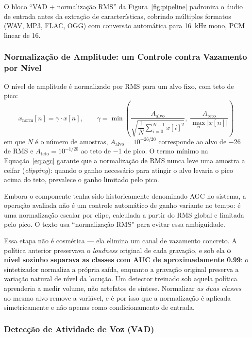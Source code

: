 \documentclass[12pt,a4paper]{article}
\begin{document}
O bloco ``VAD + normalização RMS'' da Figura~\ref{fig:pipeline} padroniza o áudio de
entrada antes da extração de características, cobrindo múltiplos formatos
(WAV, MP3, FLAC, OGG) com conversão automática para \SI{16}{\kilo\hertz}
mono, PCM linear de \SI{16}{\bit}.

\subsubsection*{Normalização de Amplitude: um Controle contra Vazamento por Nível}
\label{sec:agc}

O nível de amplitude é normalizado por RMS para um alvo fixo, com teto de pico:
\begin{equation}
	\label{eq:agc}
	x_{\mathrm{norm}}[n] = \gamma \cdot x[n], \qquad
	\gamma = \min\!\left(
	\frac{A_{\mathrm{alvo}}}{\sqrt{\dfrac{1}{N}\displaystyle\sum_{i=0}^{N-1}x[i]^2}},
	\;\frac{A_{\mathrm{teto}}}{\max_n |x[n]|}
	\right)
\end{equation}
\noindent
em que $N$ é o número de amostras, $A_{\mathrm{alvo}} = 10^{-26/20}$
corresponde ao alvo de \SI{-26}{\dBFS} de RMS e
$A_{\mathrm{teto}} = 10^{-1/20}$ ao teto de \SI{-1}{\dBFS} de pico. O termo
mínimo na Equação~\ref{eq:agc} garante que a normalização de RMS nunca leve
uma amostra a ceifar (\textit{clipping}): quando o ganho necessário para
atingir o alvo levaria o pico acima do teto, prevalece o ganho limitado pelo
pico.

Embora o componente tenha sido historicamente denominado AGC no sistema, a
operação avaliada não é um controle automático de ganho variante no tempo: é
uma normalização escalar por clipe, calculada a partir do RMS global e limitada
pelo pico. O texto usa ``normalização RMS'' para evitar essa ambiguidade.

Essa etapa não é cosmética --- ela elimina um canal de vazamento concreto.
A política anterior preservava o \textit{loudness} original de cada gravação, e
sob ela \textbf{o nível sozinho separava as classes com AUC de
	aproximadamente \num{0,99}}: o sintetizador normaliza a própria saída, enquanto
a gravação original preserva a variação natural de nível da locução. Um
detector treinado sob aquela política aprenderia a medir volume, não artefatos
de síntese. Normalizar \emph{as duas classes} ao mesmo alvo remove a variável,
e é por isso que a normalização é aplicada simetricamente e não apenas como
condicionamento de entrada.

\subsubsection*{Detecção de Atividade de Voz (VAD)}
\end{document}
